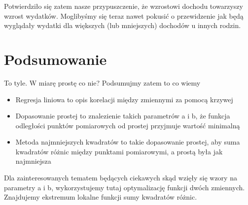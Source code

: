 \documentclass[a4paper,12pt]{article}
\begin{document}
Potwierdziło się zatem nasze przypuszczenie, że wzrostowi dochodu towarzyszy wzrost wydatków. Moglibyśmy się teraz nawet pokusić o przewidzenie jak będą wyglądały wydatki dla większych (lub mniejszych) dochodów u innych rodzin.

\section{Podsumowanie}

To tyle. W miarę prostę co nie? Podsumujmy zatem to co wiemy

\begin{itemize}
	\item Regresja liniowa to opis korelacji między zmiennymi za pomocą krzywej
	\item Dopasowanie prostej to znalezienie takich parametrów a i b, że funkcja odległości punktów pomiarowych od prostej przyjmuje wartość minimalną
	\item Metoda najmniejszych kwadratów to takie dopasowanie prostej, aby suma kwadratów różnic między punktami pomiarowymi, a prostą była jak najmniejsza
\end{itemize}

Dla zainteresowanych tematem będących ciekawych skąd wzięły się wzory na parametry a i b, wykorzystujemy tutaj optymalizację funkcji dwóch zmiennych. Znajdujemy ekstremum lokalne funkcji sumy kwadratów różnic.

\end{document}
